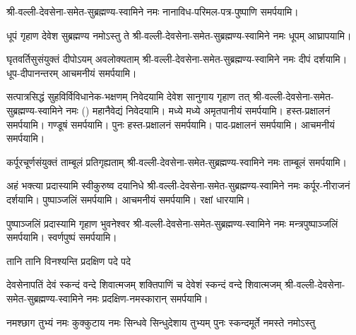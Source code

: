 \begingroup
\setlength{\columnseprule}{1pt}
\let\chapt\sect



\endgroup

श्री-वल्ली-देवसेना-समेत-सुब्रह्मण्य-स्वामिने नमः नानाविध-परिमल-पत्र-पुष्पाणि समर्पयामि।


{धूपं गृहाण देवेश सुब्रह्मण्य नमोऽस्तु ते}
श्री-वल्ली-देवसेना-समेत-सुब्रह्मण्य-स्वामिने नमः धूपम् आघ्रापयामि।

{घृतवर्तिसुसंयुक्तं दीपोऽयम् अवलोक्यताम्}
श्री-वल्ली-देवसेना-समेत-सुब्रह्मण्य-स्वामिने नमः दीपं दर्शयामि। धूप-दीपानन्तरम् आचमनीयं समर्पयामि।

\twolineshloka
{सत्पात्रसिद्धं सुहविर्विविधानेक-भक्षणम्}
{निवेदयामि देवेश सानुगाय गृहाण तत्}
श्री-वल्ली-देवसेना-समेत-सुब्रह्मण्य-स्वामिने नमः () महानैवेद्यं निवेदयामि। 
मध्ये मध्ये अमृतपानीयं समर्पयामि। हस्त-प्रक्षालनं समर्पयामि। गण्डूषं समर्पयामि। पुनः हस्त-प्रक्षालनं समर्पयामि।
 पाद-प्रक्षालनं समर्पयामि। आचमनीयं समर्पयामि।

{कर्पूरचूर्णसंयुक्तं ताम्बूलं प्रतिगृह्यताम्}
श्री-वल्ली-देवसेना-समेत-सुब्रह्मण्य-स्वामिने नमः ताम्बूलं समर्पयामि।

{अहं भक्त्या प्रदास्यामि स्वीकुरुष्व दयानिधे}
श्री-वल्ली-देवसेना-समेत-सुब्रह्मण्य-स्वामिने नमः कर्पूर-नीराजनं दर्शयामि। 
पुष्पाञ्जलिं समर्पयामि। आचमनीयं समर्पयामि। रक्षां धारयामि।

{पुष्पाञ्जलिं प्रदास्यामि गृहाण भुवनेश्वर}
श्री-वल्ली-देवसेना-समेत-सुब्रह्मण्य-स्वामिने नमः मन्त्रपुष्पाञ्जलिं समर्पयामि। स्वर्णपुष्पं समर्पयामि।

{तानि तानि विनश्यन्ति प्रदक्षिण पदे पदे}

{देवसेनापतिं देवं स्कन्दं वन्दे शिवात्मजम्}
{शक्तिपाणिं च देवेशं स्कन्दं वन्दे शिवात्मजम्}
श्री-वल्ली-देवसेना-समेत-सुब्रह्मण्य-स्वामिने नमः प्रदक्षिण-नमस्कारान् समर्पयामि।

{नमश्छाग तुभ्यं नमः कुक्कुटाय}
{नमः सिन्धवे सिन्धुदेशाय तुभ्यम्}
{पुनः स्कन्दमूर्ते नमस्ते नमोऽस्तु}

